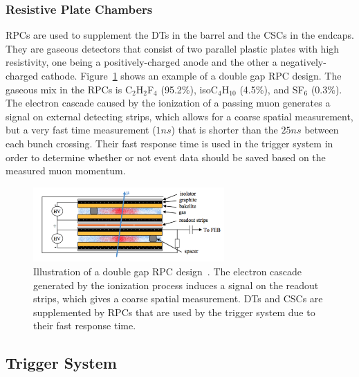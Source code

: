 \subsubsection{Resistive Plate Chambers}

RPCs are used to supplement the DTs in the barrel and the CSCs in the endcaps.
They are gaseous detectors that consist of two parallel plastic plates with high resistivity, one being a positively-charged anode and the other a negatively-charged cathode.
Figure~\ref{fig:CMSRPC} shows an example of a double gap RPC design.
The gaseous mix in the RPCs is C$_2$H$_2$F$_4$ (95.2\%), isoC$_4$H$_{10}$ (4.5\%), and SF$_6$ (0.3\%).
The electron cascade caused by the ionization of a passing muon generates a signal on external detecting strips, which allows for a coarse spatial measurement, but a very fast time measurement ($1\unit{ns}$) that is shorter than the $25\unit{ns}$ between each bunch crossing.
Their fast response time is used in the trigger system in order to determine whether or not event data should be saved based on the measured muon momentum.

\begin{figure}[htbp]
  \centering
  \includegraphics[width=0.65\textwidth]{fig/experiment/rpc_schema.pdf}
  \caption[
    Illustration of a double gap RPC design.
    The electron cascade generated by the ionization process induces a signal on the readout strips, which gives a coarse spatial measurement.
    DTs and CSCs are supplemented by RPCs that are used by the trigger system due to their fast response time.
  ]{
    Illustration of a double gap RPC design~\cite{kumari2020improvedrpc}.
    The electron cascade generated by the ionization process induces a signal on the readout strips, which gives a coarse spatial measurement.
    DTs and CSCs are supplemented by RPCs that are used by the trigger system due to their fast response time.
  }
  \label{fig:CMSRPC}
\end{figure}

\subsection{Trigger System}
\label{subsec:trigger}

